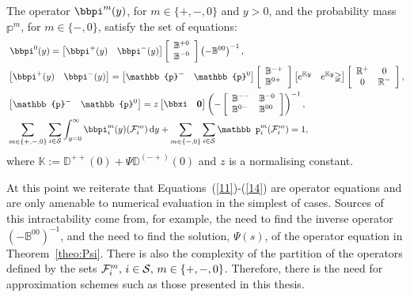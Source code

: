 \begin{theo} 
	\label{theo:density} 
The operator ${\bbpi}^{m}(y)$, for $m \in \{+,-,0\}$ and $y > 0$, and the probability mass $\mathbb{p}^{m}$, for $m \in \{-,0\}$, satisfy the set of equations:
% 	 
	\begin{align} 
	&\label{11} \; \bbpi^{0}(y) = \vligne{\bbpi^{+}(y) & \bbpi^{-}(y)}\left[\begin{array}{l} \mathbb{B}^{+0} \\ \mathbb{B}^{-0} \end{array} \right]\left(-\mathbb{B}^{00}\right)^{-1}, \\
	&  \vligne{\bbpi^{+}(y) & \bbpi^{-}(y)} = \vligne{\mathbb{p}^{-} & \mathbb{p}^{0}}\left[\begin{array}{l} \mathbb{B}^{-+} \\ \mathbb{B}^{0+} \end{array} \right]\vligne{e^{\mathbb{K}y} & e^{\mathbb{K}y}\mathbb\Psi}\left[\begin{array}{cc} \mathbb{R}^{+} & 0 \\ 0 & \mathbb{R}^{-}\end{array}\right], \\
	&  \vligne{\mathbb{p}^{-}  & \mathbb{p}^{0}} = z \vligne{{\bbxi} & \bs{0}} 
	\left(-\left[\begin{array}{ll} 
		\mathbb{B}^{--} & \mathbb{B}^{-0} \\
		\mathbb{B}^{0-} & \mathbb{B}^{00} 
		\end{array} \right] \right)^{-1},  \label{eqn:mass}\\
	& \sum_{m \in \{+,-,0\}}\sum_{i \in \mathcal{S}} \int_{y = 0}^{\infty} \bbpi_i^{m}(y)(\mathcal{F}^{m}_i)\wrt y + \sum_{m \in \{-,0\}} \sum_{i \in \mathcal{S}}\mathbb p^{m}_i(\mathcal{F}^{m}_i) = 1, \label{14}
	\end{align}
	where $\mathbb{K} := \mathbb{D}^{++}(0) + \mathbb\Psi\mathbb{D}^{(-+)}(0)$ and $z$ is a normalising constant. 
\end{theo} 

At this point we reiterate that Equations~(\ref{11})-(\ref{14}) are operator equations and are only amenable to numerical evaluation in the simplest of cases. Sources of this intractability come from, for example, the need to find the inverse operator \(( - \mathbb B^{00})^{-1}\), and the need to find the solution, \(\mathbb \Psi(s)\), of the operator equation in Theorem~\ref{theo:Psi}. There is also the complexity of the partition of the operators defined by the sets \(\mathcal F_{i}^m,\, i\in\mathcal{S},\,m\in\{+,-,0\}\). Therefore, there is the need for approximation schemes such as those presented in this thesis. 

